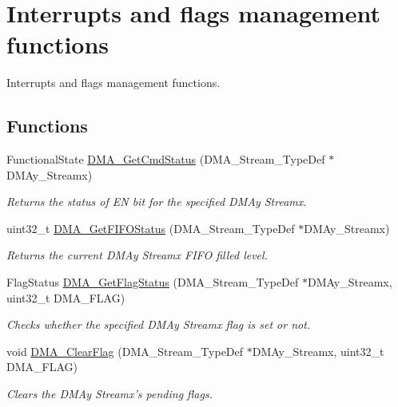 \hypertarget{group___d_m_a___group4}{\section{Interrupts and flags management functions}
\label{group___d_m_a___group4}
}


Interrupts and flags management functions.  


\subsection*{Functions}
\begin{DoxyCompactItemize}
\item 
Functional\-State \hyperlink{group___d_m_a___group4_gaa4d631cdd6cd020106435f30c0c6fb15}{D\-M\-A\-\_\-\-Get\-Cmd\-Status} (D\-M\-A\-\_\-\-Stream\-\_\-\-Type\-Def $\ast$D\-M\-Ay\-\_\-\-Streamx)
\begin{DoxyCompactList}\small\item\em Returns the status of E\-N bit for the specified D\-M\-Ay Streamx. \end{DoxyCompactList}\item 
uint32\-\_\-t \hyperlink{group___d_m_a___group4_ga9893809a7067861ec111f7d712ebf28d}{D\-M\-A\-\_\-\-Get\-F\-I\-F\-O\-Status} (D\-M\-A\-\_\-\-Stream\-\_\-\-Type\-Def $\ast$D\-M\-Ay\-\_\-\-Streamx)
\begin{DoxyCompactList}\small\item\em Returns the current D\-M\-Ay Streamx F\-I\-F\-O filled level. \end{DoxyCompactList}\item 
Flag\-Status \hyperlink{group___d_m_a___group4_ga10cfc0fe31d64a1fd8fb3efb4ae2a411}{D\-M\-A\-\_\-\-Get\-Flag\-Status} (D\-M\-A\-\_\-\-Stream\-\_\-\-Type\-Def $\ast$D\-M\-Ay\-\_\-\-Streamx, uint32\-\_\-t D\-M\-A\-\_\-\-F\-L\-A\-G)
\begin{DoxyCompactList}\small\item\em Checks whether the specified D\-M\-Ay Streamx flag is set or not. \end{DoxyCompactList}\item 
void \hyperlink{group___d_m_a___group4_ga510d62b4051f5a5de164e84b266b851d}{D\-M\-A\-\_\-\-Clear\-Flag} (D\-M\-A\-\_\-\-Stream\-\_\-\-Type\-Def $\ast$D\-M\-Ay\-\_\-\-Streamx, uint32\-\_\-t D\-M\-A\-\_\-\-F\-L\-A\-G)
\begin{DoxyCompactList}\small\item\em Clears the D\-M\-Ay Streamx's pending flags. \end{DoxyCompactList}\item 

\end{DoxyCompactItemize}
